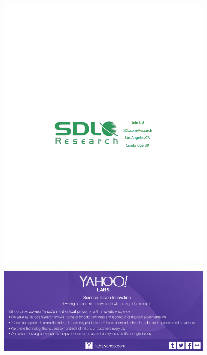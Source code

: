 \includegraphics[width=4.25in]{content/ads/silver/sdl_research.pdf}

\includegraphics[width=4.25in]{content/ads/bronze/yahoo_labs.pdf}
